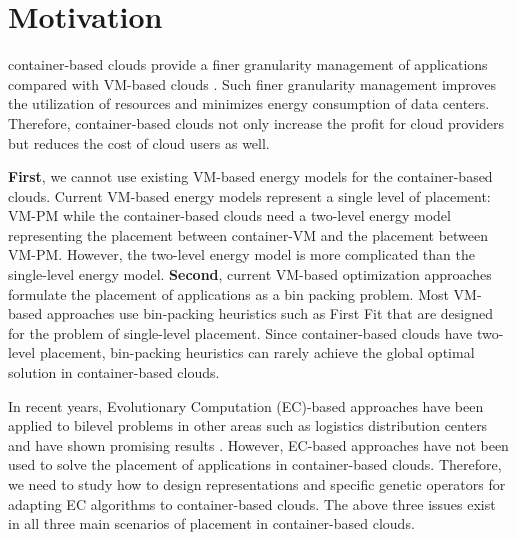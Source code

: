\section{Motivation}
\label{sec:motivation}

 container-based clouds provide a finer granularity management of applications compared with VM-based clouds \cite{:2017ff}. Such finer granularity management improves the utilization of resources and minimizes energy consumption of data centers. Therefore, container-based clouds not only increase the profit for cloud providers but reduces the cost of cloud users as well.

 \textbf{First}, we cannot use existing VM-based energy models for the container-based clouds. Current VM-based energy models represent a single level of placement: VM-PM while the container-based clouds need a two-level energy model representing the placement between container-VM and the placement between VM-PM. However, the two-level energy model is more complicated than the single-level energy model. 
\textbf{Second}, current VM-based optimization approaches \cite{Beloglazov:2010dt, Liu:2013kl} formulate the placement of applications as a bin packing problem. Most VM-based approaches use bin-packing heuristics such as First Fit \cite{Dosa:2013ie} that are designed for the problem of single-level placement. Since container-based clouds have two-level placement,  bin-packing heuristics can rarely achieve the global optimal solution in container-based clouds. 


In recent years, Evolutionary Computation (EC)-based approaches have been applied to bilevel problems in other areas such as logistics distribution centers and have shown promising results \cite{Angelo:2013ee, Sinha:2017et, Deb:2010in}. However, EC-based approaches have not been used to solve the placement of applications in container-based clouds. Therefore, we need to study how to design representations and specific genetic operators for adapting EC algorithms to container-based clouds.  The above three issues exist in all three main scenarios of placement in container-based clouds. 

